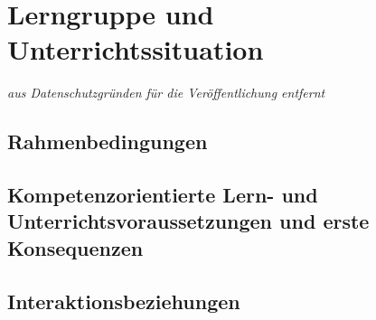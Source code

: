 
\section{Lerngruppe und Unterrichtssituation}

\emph{aus Datenschutzgründen für die Veröffentlichung entfernt}


\subsection{Rahmenbedingungen}


\subsection{Kompetenzorientierte Lern- und Unterrichtsvoraussetzungen und erste Konsequenzen}


\subsection{Interaktionsbeziehungen}
